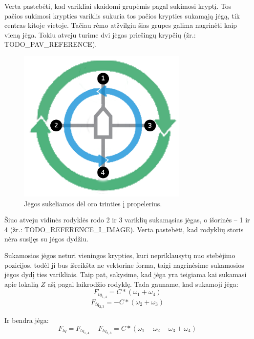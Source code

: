 \documentclass[12pt, a4paper, lithuanian, final]{article}
\begin{document}
Verta pastebėti, kad varikliai skaidomi grupėmis pagal sukimosi kryptį. Tos pačios sukimosi krypties variklis sukuria tos pačios krypties sukamąją jėgą, tik centras kitoje vietoje. Tačiau rėmo atžvilgiu šias grupes galima nagrinėti kaip vieną jėga.
Tokiu atveju turime dvi jėgas priešingų krypčių (žr.: TODO\_PAV\_REFERENCE).

\begin{figure}[H]
\begin{center}
\includegraphics[width=0.75\textwidth]{img/quadcopter-torque-grouped.png}
\caption{Jėgos sukeliamos dėl oro trinties į propelerius.}
\end{center}
\end{figure}

Šiuo atveju vidinės rodyklės rodo 2 ir 3 variklių sukamąsias jėgas, o išorinės -- 1 ir 4 (žr.: TODO\_REFERENCE\_I\_IMAGE).
Verta pastebėti, kad rodyklių storis nėra susijęs su jėgos dydžiu.

Sukamosios jėgos neturi vieningos krypties, kuri nepriklausytų nuo stebėjimo pozicijos, todėl ji bus išreikšta ne vektorine forma, taigi nagrinėsime sukamosios jėgos dydį ties varikliais.
Taip pat, sakysime, kad jėga yra teigiama kai sukamasi apie lokalią $Z$ ašį pagal laikrodžio rodyklę.
Tada gauname, kad sukamoji jėga:
\begin{equation}
	F_{tq_{1,4}} = C * (\omega_{1} + \omega_{4})
\end{equation}
\begin{equation}
	F_{tq_{2,3}} = -C * (\omega_{2} + \omega_{3})
\end{equation}

Ir bendra jėga:
\begin{equation}
	F_{tq} = F_{tq_{1,4}} - F_{tq_{2,3}} = C * (\omega_{1} - \omega_{2} - \omega_{3} + \omega_{4})
\end{equation}
\end{document}
